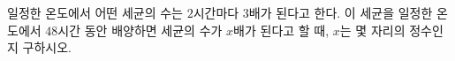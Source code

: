 일정한 온도에서 어떤 세균의 수는 $2$시간마다 $3$배가 된다고 한다. 이 세균을 일정한 온도에서 $48$시간 동안 배양하면 세균의 수가 $x$배가 된다고 할 때, $x$는 몇 자리의 정수인지 구하시오. 
